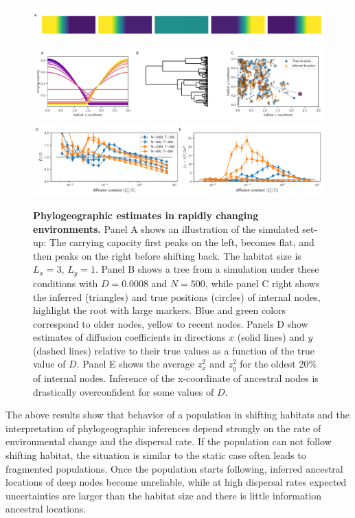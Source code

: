\documentclass[aps,rmp, twocolumn]{revtex4}
\begin{document}
\begin{figure}
    \includegraphics[width=\textwidth]{figures/seasaw_illustration}
    \includegraphics[width=\textwidth]{figures/seasaw_example}
    \includegraphics[width=\textwidth]{figures/seasaw}
    \caption{\label{fig:seasaw} {\bf Phylogeographic estimates in rapidly changing environments.} Panel A shows an illustration of the simulated set-up: The carrying capacity first peaks on the left, becomes flat, and then peaks on the right before shifting back. The habitat size is $L_x=3$, $L_y=1$.
    Panel B shows a tree from a simulation under these conditions with $D=0.0008$ and $N=500$, while panel C right shows the inferred (triangles) and true positions (circles) of internal nodes, highlight the root with large markers. Blue and green colors correspond to older nodes, yellow to recent nodes.
    Panels D show estimates of diffusion coefficients in directions $x$ (solid lines) and $y$ (dashed lines) relative to their true values as a function of the true value of $D$. Panel E shows the average $z_x^2$ and $z_y^2$ for the oldest 20\% of internal nodes. Inference of the x-coordinate of ancestral nodes is drastically overconfident for some values of $D$. }
\end{figure}

The above results show that behavior of a population in shifting habitats and the interpretation of phylogeographic inferences depend strongly on the rate of environmental change and the dispersal rate.
If the population can not follow shifting habitat, the situation is similar to the static case often leads to fragmented populations.
Once the population starts following, inferred ancestral locations of deep nodes become unreliable, while at high dispersal rates expected uncertainties are larger than the habitat size and there is little information ancestral locations.
\end{document}

